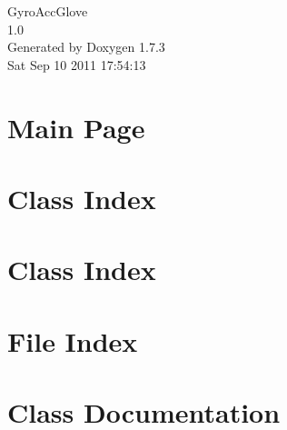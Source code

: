 \documentclass[a4paper]{article}
\begin{document}
\hypersetup{pageanchor=false}
\begin{titlepage}
\vspace*{7cm}
\begin{center}
{\Large GyroAccGlove \\[1ex]\large 1.0 }\\
\vspace*{1cm}
{\large Generated by Doxygen 1.7.3}\\
\vspace*{0.5cm}
{\small Sat Sep 10 2011 17:54:13}\\
\end{center}
\end{titlepage}
\tableofcontents
{}
\hypersetup{pageanchor=true}
\section{Main Page}
\label{index}\hypertarget{index}{}
\section{Class Index}

\section{Class Index}

\section{File Index}

\section{Class Documentation}














\end{document}
